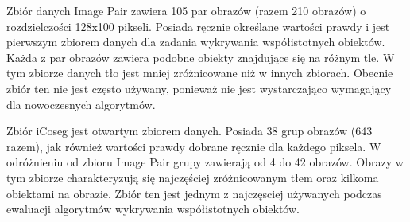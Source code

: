 \documentclass[a4paper,12pt,twoside,openany]{report}
\newcommand{\ImgPath}{.}
\begin{document}
	Zbiór danych Image Pair zawiera 105 par obrazów (razem 210 obrazów) o rozdzielczości 128x100 pikseli. Posiada ręcznie określane wartości prawdy i jest pierwszym zbiorem danych dla zadania wykrywania współistotnych obiektów. Każda z par obrazów zawiera podobne obiekty znajdujące się na różnym tle. W tym zbiorze danych tło jest mniej zróżnicowane niż w innych zbiorach. Obecnie zbiór ten nie jest często używany, ponieważ nie jest wystarczająco wymagający dla nowoczesnych algorytmów.
	


	Zbiór iCoseg jest otwartym zbiorem danych. Posiada 38 grup obrazów (643 razem), jak również wartości prawdy dobrane ręcznie dla każdego piksela. W odróżnieniu od zbioru Image Pair grupy zawierają od 4 do 42 obrazów. Obrazy w tym zbiorze charakteryzują się najczęściej zróżnicowanym tłem oraz kilkoma obiektami na obrazie. Zbiór ten jest jednym z najczęsciej używanych podczas ewaluacji algorytmów wykrywania współistotnych obiektów.
\end{document}
